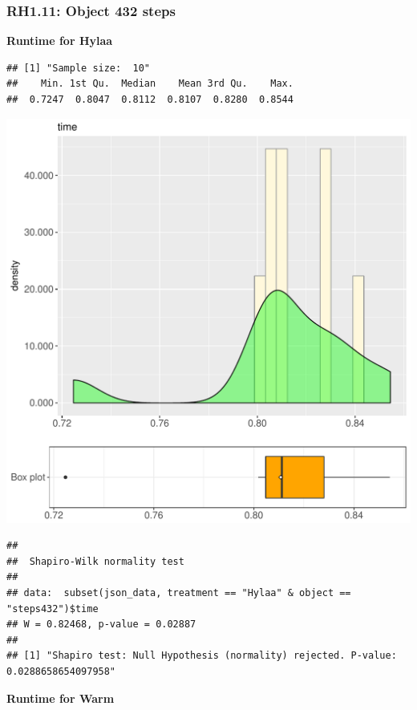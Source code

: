 \documentclass{article}\usepackage[]{graphicx}\usepackage[]{color}
\makeatletter
\def\maxwidth{ %
  \ifdim\Gin@nat@width>\linewidth
    \linewidth
  \else
    \Gin@nat@width
  \fi
}
\newenvironment{kframe}{%
 \def\at@end@of@kframe{}%
 \ifinner\ifhmode%
  \def\at@end@of@kframe{\end{minipage}}%
  \begin{minipage}{\columnwidth}%
 \fi\fi%
 \def\FrameCommand##1{\hskip\@totalleftmargin \hskip-\fboxsep
 \colorbox{shadecolor}{##1}\hskip-\fboxsep
     \hskip-\linewidth \hskip-\@totalleftmargin \hskip\columnwidth}%
 \MakeFramed {\advance\hsize-\width
   \@totalleftmargin\z@ \linewidth\hsize
   \@setminipage}}%
 {\par\unskip\endMakeFramed%
 \at@end@of@kframe}
\newenvironment{knitrout}{}{} %
\makeatother
\begin{document}
\subsubsection{RH1.11: Object 432 steps}

 \textbf{Runtime for Hylaa}
\begin{knitrout}
\color{fgcolor}\begin{kframe}
\begin{verbatim}
## [1] "Sample size:  10"
##    Min. 1st Qu.  Median    Mean 3rd Qu.    Max. 
##  0.7247  0.8047  0.8112  0.8107  0.8280  0.8544
\end{verbatim}
\end{kframe}
\includegraphics[width=\maxwidth]{figure/RH1_Hylaa_steps432-1} 
\begin{kframe}\begin{verbatim}
## 
## 	Shapiro-Wilk normality test
## 
## data:  subset(json_data, treatment == "Hylaa" & object == "steps432")$time
## W = 0.82468, p-value = 0.02887
## 
## [1] "Shapiro test: Null Hypothesis (normality) rejected. P-value: 0.0288658654097958"
\end{verbatim}
\end{kframe}
\end{knitrout}
 \textbf{Runtime for Warm}
\end{document}
